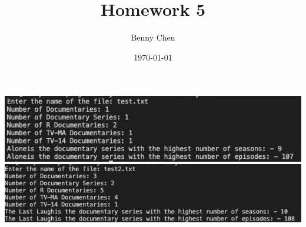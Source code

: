 \documentclass{article}
\title{Homework 5}
\author{Benny Chen}
\date{\today}
\begin{document}
\maketitle

\begin{center}
    \includegraphics[width=\textwidth]{test.png}
    \includegraphics[width=\textwidth]{test2.png}
\end{center}
\end{document}
